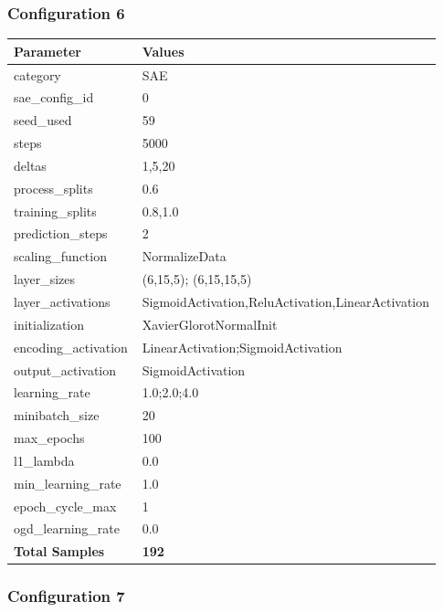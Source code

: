 \documentclass[a4paper,11pt,oneside]{article}
\theoremstyle{plain}
\theoremstyle{definition}
\begin{document}
	\newpage
	\subsubsection{Configuration 6}\label{config6}
	\begin{longtable}[H]{|p{0.3\linewidth}|p{0.7\linewidth}|} \hline 			\rowcolor{beaublue}\textbf{Parameter} &\textbf{Values} \\\hline{category} & {SAE} \\\hline
		{sae\_config\_id} & {0} \\\hline
		{seed\_used} & {59} \\\hline
		{steps} & {5000} \\\hline
		{deltas} & {1,5,20} \\\hline
		{process\_splits} & {0.6} \\\hline
		{training\_splits} & {0.8,1.0} \\\hline
		{prediction\_steps} & {2} \\\hline
		{scaling\_function} & {NormalizeData} \\\hline
		{layer\_sizes} & {(6,15,5); (6,15,15,5)} \\\hline
		{layer\_activations} & {SigmoidActivation,ReluActivation,LinearActivation} \\\hline
		{initialization} & {XavierGlorotNormalInit} \\\hline
		{encoding\_activation} & {LinearActivation;SigmoidActivation} \\\hline
		{output\_activation} & {SigmoidActivation} \\\hline
		{learning\_rate} & {1.0;2.0;4.0} \\\hline
		{minibatch\_size} & {20} \\\hline
		{max\_epochs} & {100} \\\hline
		{l1\_lambda} & {0.0} \\\hline
		{min\_learning\_rate} & {1.0} \\\hline
		{epoch\_cycle\_max} & {1} \\\hline
		{ogd\_learning\_rate} & {0.0} \\\hline
		{\textbf{Total Samples}} & {\textbf{192}} \\\hline
	\end{longtable}
	
	\newpage
	\subsubsection{Configuration 7}\label{config7}
\end{document}

